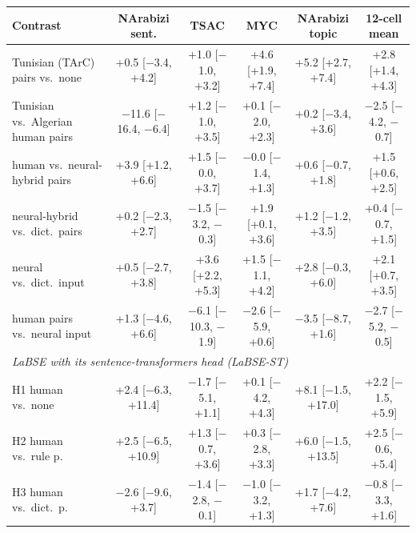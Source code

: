 \begin{tabular}{l cccc c}
\toprule
Contrast & NArabizi sent. & TSAC & MYC & NArabizi topic & 12-cell mean \\
\midrule
Tunisian (TArC) pairs vs.\ none & +0.5 [$-$3.4, +4.2] & +1.0 [$-$1.0, +3.2] & +4.6 [+1.9, +7.4] & +5.2 [+2.7, +7.4] & +2.8 [+1.4, +4.3] \\
Tunisian vs.\ Algerian human pairs & $-$11.6 [$-$16.4, $-$6.4] & +1.2 [$-$1.0, +3.5] & +0.1 [$-$2.0, +2.3] & +0.2 [$-$3.4, +3.6] & $-$2.5 [$-$4.2, $-$0.7] \\
human vs.\ neural-hybrid pairs & +3.9 [+1.2, +6.6] & +1.5 [$-$0.0, +3.7] & $-$0.0 [$-$1.4, +1.3] & +0.6 [$-$0.7, +1.8] & +1.5 [+0.6, +2.5] \\
neural-hybrid vs.\ dict.\ pairs & +0.2 [$-$2.3, +2.7] & $-$1.5 [$-$3.2, $-$0.3] & +1.9 [+0.1, +3.6] & +1.2 [$-$1.2, +3.5] & +0.4 [$-$0.7, +1.5] \\
neural vs.\ dict.\ input & +0.5 [$-$2.7, +3.8] & +3.6 [+2.2, +5.3] & +1.5 [$-$1.1, +4.2] & +2.8 [$-$0.3, +6.0] & +2.1 [+0.7, +3.5] \\
human pairs vs.\ neural input & +1.3 [$-$4.6, +6.6] & $-$6.1 [$-$10.3, $-$1.9] & $-$2.6 [$-$5.9, +0.6] & $-$3.5 [$-$8.7, +1.6] & $-$2.7 [$-$5.2, $-$0.5] \\
\midrule
\multicolumn{6}{l}{\textit{LaBSE with its sentence-transformers head (LaBSE-ST)}} \\
H1 human vs.\ none & +2.4 [$-$6.3, +11.4] & $-$1.7 [$-$5.1, +1.1] & +0.1 [$-$4.2, +4.3] & +8.1 [$-$1.5, +17.0] & +2.2 [$-$1.5, +5.9] \\
H2 human vs.\ rule p. & +2.5 [$-$6.5, +10.9] & +1.3 [$-$0.7, +3.6] & +0.3 [$-$2.8, +3.3] & +6.0 [$-$1.5, +13.5] & +2.5 [$-$0.6, +5.4] \\
H3 human vs.\ dict.\ p. & $-$2.6 [$-$9.6, +3.7] & $-$1.4 [$-$2.8, $-$0.1] & $-$1.0 [$-$3.2, +1.3] & +1.7 [$-$4.2, +7.6] & $-$0.8 [$-$3.3, +1.6] \\
\bottomrule
\end{tabular}
